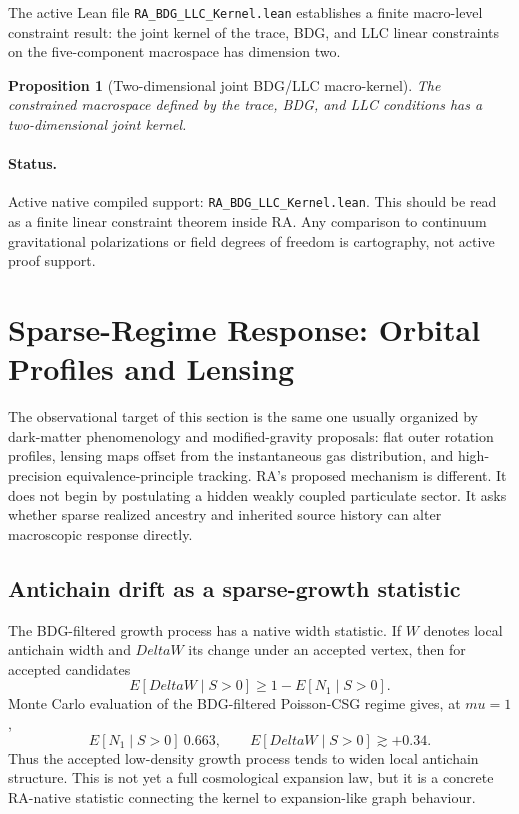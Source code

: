 \documentclass[11pt]{article}
\def\Delta{Delta}%
\def\mu{mu}%
\def\mathbb#1{#1}%
\def\approx{~}%
\newtheorem{proposition}{Proposition}
\begin{document}
The active Lean file \texttt{RA\_BDG\_LLC\_Kernel.lean} establishes a finite macro-level constraint result: the joint kernel of the trace, BDG, and LLC linear constraints on the five-component macrospace has dimension two.
\begin{proposition}[Two-dimensional joint BDG/LLC macro-kernel]
The constrained macrospace defined by the trace, BDG, and LLC conditions has a two-dimensional joint kernel.
\end{proposition}

\paragraph{Status.} Active native compiled support: \texttt{RA\_BDG\_LLC\_Kernel.lean}. This should be read as a finite linear constraint theorem inside RA. Any comparison to continuum gravitational polarizations or field degrees of freedom is cartography, not active proof support.

\section{Sparse-Regime Response: Orbital Profiles and Lensing}
\label{sec:sparse}

The observational target of this section is the same one usually organized by dark-matter phenomenology and modified-gravity proposals: flat outer rotation profiles, lensing maps offset from the instantaneous gas distribution, and high-precision equivalence-principle tracking. RA's proposed mechanism is different. It does not begin by postulating a hidden weakly coupled particulate sector. It asks whether sparse realized ancestry and inherited source history can alter macroscopic response directly.

\subsection{Antichain drift as a sparse-growth statistic}

The BDG-filtered growth process has a native width statistic. If \(W\) denotes local antichain width and \(\Delta W\) its change under an accepted vertex, then for accepted candidates
\begin{equation}
\mathbb{E}[\Delta W\mid S>0]\ge 1-\mathbb{E}[N_1\mid S>0].
\end{equation}
Monte Carlo evaluation of the BDG-filtered Poisson-CSG regime gives, at \(\mu=1\),
\begin{equation}
\mathbb{E}[N_1\mid S>0]\approx0.663,
\qquad
\mathbb{E}[\Delta W\mid S>0]\gtrsim+0.34.
\end{equation}
Thus the accepted low-density growth process tends to widen local antichain structure. This is not yet a full cosmological expansion law, but it is a concrete RA-native statistic connecting the kernel to expansion-like graph behaviour.
\end{document}

